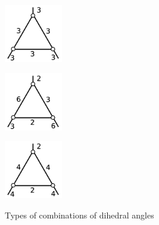 \documentclass[suppldata, dvipdfmx]{interact}
\theoremstyle{plain}%
\theoremstyle{definition}
\theoremstyle{remark}
\theoremstyle{problemstyle}
\begin{document}
\begin{figure}[h!tbp]
  \begin{minipage}[t]{0.23\textwidth}
   \centering
   \includegraphics[width=1in,
   keepaspectratio]{./img/HexahedraWithSphericalFaces/tetrahedron/a.jpg}
   \label{fig:tetrahedronType1}
  \end{minipage}
  \hspace*{\fill}
  \begin{minipage}[t]{0.23\textwidth}
   \centering
   \includegraphics[width=1in, keepaspectratio]{./img/HexahedraWithSphericalFaces/tetrahedron/b.jpg}
   \label{fig:tetrahedronType2}
  \end{minipage}
 \hspace*{\fill}
  \begin{minipage}[t]{0.23\textwidth}
   \centering
   \includegraphics[width=1in, keepaspectratio]{./img/HexahedraWithSphericalFaces/tetrahedron/c.jpg}
   \label{fig:tetrahedronType3}
  \end{minipage}
 \hspace*{\fill}
 \caption{Types of combinations of dihedral angles}
 \label{fig:tetrahedronCombinations}
\end{figure}
\end{document}
